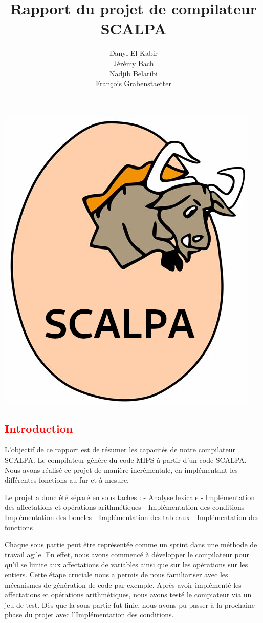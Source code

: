 \documentclass[a4paper]{article}
\title{Rapport du projet de compilateur SCALPA}
\author{Danyl El-Kabir\\Jérémy Bach\\Nadjib Belaribi\\François Grabenstaetter}
\newcommand{\csection}[1]{\textcolor{red}{\section{#1}}}
\begin{document}
\sffamily
\everymath{\displaystyle}
\setlength\parindent{0mm}
\setlength{\parskip}{0.2cm}
\maketitle

\begin{center}
    \includegraphics[scale=0.8]{img/scalpa.png}
\end{center}

\newpage
\tableofcontents
\newpage

\csection{Introduction}

L'objectif de ce rapport est de résumer les capacités de notre compilateur SCALPA. Le compilateur génère du code MIPS à partir d'un code SCALPA. Nous avons réalisé ce projet de manière incrémentale, en implémentant les différentes fonctions au fur et à mesure.

Le projet a donc été séparé en sous taches :
- Analyse lexicale
- Implémentation des affectations et opérations arithmétiques
- Implémentation des conditions
- Implémentation des boucles
- Implémentation des tableaux
- Implémentation des fonctions

Chaque sous partie peut être représentée comme un sprint dans une méthode de travail agile.
En effet, nous avons commencé à développer le compilateur pour qu'il se limite aux affectations de variables ainsi que sur les opérations sur les entiers. Cette étape cruciale nous a permis de nous familiariser avec les mécanismes de génération de code par exemple.
Après avoir implémenté les affectations et opérations arithmétiques, nous avons testé le compiateur via un jeu de test. Dès que la sous partie fut finie, nous avons pu passer à la prochaine phase du projet avec l'Implémentation des conditions.
\end{document}
